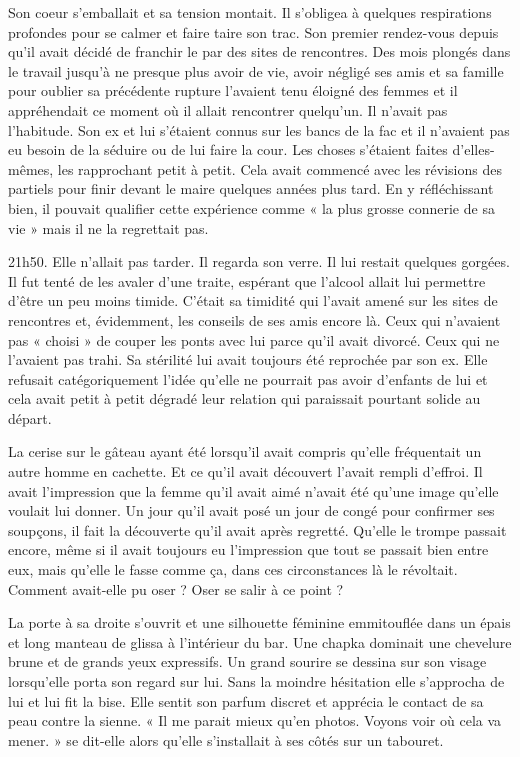 Son coeur s'emballait et sa tension montait. Il s'obligea à quelques respirations profondes pour se calmer et faire
taire son trac. Son premier rendez-vous depuis qu'il avait décidé de franchir le par des sites de rencontres. Des mois
plongés dans le travail jusqu'à ne presque plus avoir de vie, avoir négligé ses amis et sa famille pour oublier sa
précédente rupture l'avaient tenu éloigné des femmes et il appréhendait ce moment où il allait rencontrer quelqu'un. Il
n'avait pas l'habitude. Son ex et lui s'étaient connus sur les bancs de la fac et il n'avaient pas eu besoin de la
séduire ou de lui faire la cour. Les choses s'étaient faites d'elles-mêmes, les rapprochant petit à petit. Cela avait
commencé avec les révisions des partiels pour finir devant le maire quelques années plus tard. En y réfléchissant bien,
il pouvait qualifier cette expérience comme « la plus grosse connerie de sa vie » mais il ne la regrettait pas.

21h50. Elle n'allait pas tarder. Il regarda son verre. Il lui restait quelques gorgées. Il fut tenté de les avaler
d'une traite, espérant que l'alcool allait lui permettre d'être un peu moins timide. C'était sa timidité qui l'avait
amené sur les sites de rencontres et, évidemment, les conseils de ses amis encore là. Ceux qui n'avaient pas « choisi » de
couper les ponts avec lui parce qu'il avait divorcé. Ceux qui ne l'avaient pas trahi. Sa stérilité lui avait toujours
été reprochée par son ex. Elle refusait catégoriquement l'idée qu'elle ne pourrait pas avoir d'enfants de lui et cela
avait petit à petit dégradé leur relation qui paraissait pourtant solide au départ.

La cerise sur le gâteau ayant été lorsqu'il avait compris qu'elle fréquentait un autre homme en cachette. Et ce qu'il
avait découvert l'avait rempli d'effroi. Il avait l'impression que la femme qu'il avait aimé n'avait été qu'une image
qu'elle voulait lui donner. Un jour qu'il avait posé un jour de congé pour confirmer ses soupçons, il fait la découverte
qu'il avait après regretté. Qu'elle le trompe passait encore, même si il avait toujours eu l'impression que tout se
passait bien entre eux, mais qu'elle le fasse comme ça, dans ces circonstances là le révoltait. Comment avait-elle pu
oser ? Oser se salir à ce point ?

La porte à sa droite s'ouvrit et une silhouette féminine emmitouflée dans un épais et long manteau de glissa à
l'intérieur du bar. Une chapka dominait une chevelure brune et de grands yeux expressifs. Un grand sourire se dessina
sur son visage lorsqu'elle porta son regard sur lui. Sans la moindre hésitation elle s'approcha de lui et lui fit la
bise. Elle sentit son parfum discret et apprécia le contact de sa peau contre la sienne. « Il me parait mieux qu'en
photos. Voyons voir où cela va mener. » se dit-elle alors qu'elle s'installait à ses côtés sur un tabouret.

